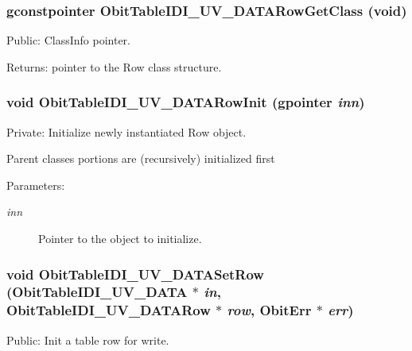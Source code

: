 \subsubsection{\setlength{\rightskip}{0pt plus 5cm}gconstpointer Obit\-Table\-IDI\_\-UV\_\-DATARow\-Get\-Class (void)}\label{ObitTableIDI__UV__DATA_8c_a15}


Public: Class\-Info pointer. 

\begin{Desc}
\item[Returns:]pointer to the Row class structure. \end{Desc}
\subsubsection{\setlength{\rightskip}{0pt plus 5cm}void Obit\-Table\-IDI\_\-UV\_\-DATARow\-Init (gpointer {\em inn})}\label{ObitTableIDI__UV__DATA_8c_a6}


Private: Initialize newly instantiated Row object. 

Parent classes portions are (recursively) initialized first \begin{Desc}
\item[Parameters:]
\begin{description}
\item[{\em inn}]Pointer to the object to initialize. \end{description}
\end{Desc}
\subsubsection{\setlength{\rightskip}{0pt plus 5cm}void Obit\-Table\-IDI\_\-UV\_\-DATASet\-Row ({\bf Obit\-Table\-IDI\_\-UV\_\-DATA} $\ast$ {\em in}, {\bf Obit\-Table\-IDI\_\-UV\_\-DATARow} $\ast$ {\em row}, {\bf Obit\-Err} $\ast$ {\em err})}\label{ObitTableIDI__UV__DATA_8c_a23}


Public: Init a table row for write. 

